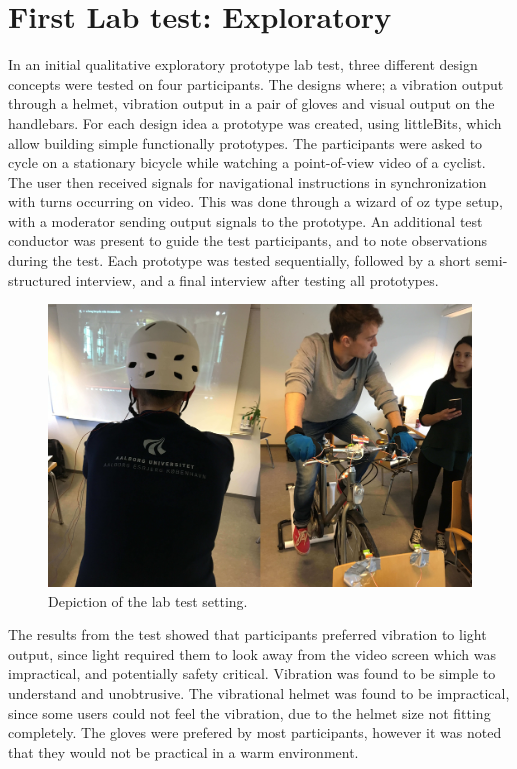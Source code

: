 \documentclass{sigchi}
\begin{document}
\section{First Lab test: Exploratory}
In an initial qualitative exploratory prototype lab test, three different design concepts were tested on four participants. The designs where; a vibration output through a helmet, vibration output in a pair of gloves and visual output on the handlebars. 
For each design idea a prototype was created, using littleBits, which allow building simple functionally prototypes. The participants were asked to cycle on a stationary bicycle while watching a point-of-view video of a cyclist. The user then received signals for navigational instructions in synchronization with turns occurring on video. This was done through a wizard of oz type setup, with a moderator sending output signals to the prototype. An additional test conductor was present to guide the test participants, and to note observations during the test. Each prototype was tested sequentially, followed by a short semi-structured interview, and a final interview after testing all prototypes.
\begin{figure}
\centering
\includegraphics[width=0.9\columnwidth]{figures/eval1_setup.jpg}
\caption{Depiction of the lab test setting.}
\label{fig:eval1_setup}
\end{figure}
The results from the test showed that participants preferred vibration to light output, since light required them to look away from the video screen which was impractical, and potentially safety critical. Vibration was found to be simple to understand and unobtrusive. The vibrational helmet was found to be impractical, since some users could not feel the vibration, due to the helmet size not fitting completely. The gloves were prefered by most participants, however it was noted that they would not be practical in a warm environment.
\end{document}
